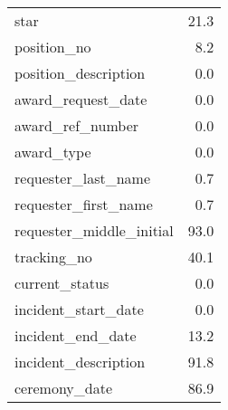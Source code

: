 \begin{table}
\begin{minipage}[t]{0.48\textwidth}
\begin{tabular}{lr}
                    star &       21.3 \\
             position\_no &        8.2 \\
    position\_description &        0.0 \\
      award\_request\_date &        0.0 \\
        award\_ref\_number &        0.0 \\
              award\_type &        0.0 \\
     requester\_last\_name &        0.7 \\
    requester\_first\_name &        0.7 \\
requester\_middle\_initial &       93.0 \\
             tracking\_no &       40.1 \\
          current\_status &        0.0 \\
     incident\_start\_date &        0.0 \\
       incident\_end\_date &       13.2 \\
    incident\_description &       91.8 \\
           ceremony\_date &       86.9 \\
\bottomrule
\end{tabular}
\end{minipage}

\end{table}
